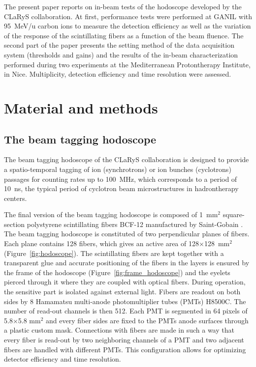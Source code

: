 \documentclass[a4paper,11pt]{article}
\begin{document}
The present paper reports on in-beam tests of the hodoscope developed by the CLaRyS collaboration. At first, performance tests were performed at GANIL with 95~MeV/u carbon ions to measure the detection efficiency as well as the variation of the response of the scintillating fibers as a function of the beam fluence. The second part of the paper presents the setting method of the data acquisition system (thresholds and gains) and the results of the in-beam characterization performed during two experiments at the Mediterranean Protontherapy Institute, in Nice. Multiplicity, detection efficiency and time resolution were assessed. 

\section{Material and methods}
\subsection{The beam tagging hodoscope}
\label{sec:hodo}

The beam tagging hodoscope of the CLaRyS collaboration is designed to provide a spatio-temporal tagging of ion (synchrotrons) or ion bunches (cyclotrons) passages for counting rates up to 100~MHz, which corresponds to a period of 10~ns, the typical period of cyclotron beam microstructures in hadrontherapy centers. 

The final version of the beam tagging hodoscope is composed  of 1~mm$^{2}$ square-section polystyrene scintillating fibers BCF-12 manufactured by Saint-Gobain \cite{SaintGobain2017}.
The beam tagging hodoscope is constituted of two perpendicular planes of fibers. Each plane contains 128 fibers, which gives an active area of 128$\times$128~mm$^{2}$ (Figure~\ref{fig:hodoscope}). The scintillating fibers are kept together with a transparent glue and accurate positioning of the fibers in the layers is ensured by the frame of the hodoscope (Figure~\ref{fig:frame_hodoscope}) and the eyelets pierced through it where they are coupled with optical fibers. During operation, the sensitive part is isolated against external light. Fibers are readout on both sides by 8 Hamamatsu multi-anode photomultiplier tubes (PMTs) H8500C. The number of read-out channels is then 512. Each PMT is segmented in 64 pixels of 5.8$\times$5.8 mm$^2$ and every fiber sides are fixed to the PMTs anode surfaces through a plastic custom mask. Connections with fibers are made in such a way that every fiber is read-out by two neighboring channels of a PMT and two adjacent fibers are handled with different PMTs. This configuration allows for optimizing detector efficiency and time resolution. 
\end{document}
